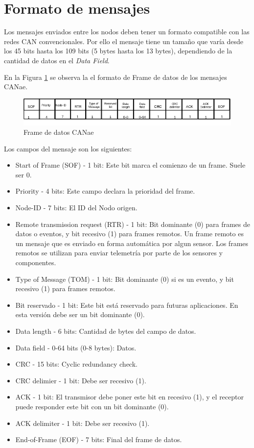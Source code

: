 \section{Formato de mensajes}
Los mensajes enviados entre los nodos deben tener un formato compatible con las
redes CAN convencionales. Por ello el mensaje tiene un tamaño que varía desde
los 45 bits hasta los 109 bits (5 bytes hasta los 13 bytes), dependiendo de la cantidad de datos en el
\textit{Data Field}.

En la Figura \ref{fig:Data_Frame} se observa la el formato de Frame de datos de
los mensajes CANae.

\begin{figure}[h!]
 \centering
 \includegraphics[scale=0.6]{images/Secciones/AppendixA/Data_Frame.jpg}
  \caption{Frame de datos CANae}
\label{fig:Data_Frame}
\end{figure}

Los campos del mensaje son los siguientes:

\begin{itemize}
\item Start of Frame (SOF) - 1 bit: Este bit marca el comienzo de un frame.
  Suele ser 0.
\item Priority - 4 bits: Este campo declara la prioridad del frame. 
\item Node-ID - 7 bits: El ID del Nodo origen.
\item Remote transmission request (RTR) - 1 bit: Bit dominante (0) para frames
  de datos o eventos, y bit recesivo (1) para frames remotos. Un frame remoto
  es un mensaje que es enviado en forma automática por algun sensor. Los frames
  remotos se utilizan para enviar telemetría por parte de los sensores y
  componentes.
\item Type of Message (TOM) - 1 bit: Bit dominante (0) si es un evento, y bit
  recesivo (1) para frames remotos.
\item Bit reservado - 1 bit: Este bit está reservado para futuras aplicaciones.
  En esta versión debe ser un bit dominante (0).
\item Data length - 6 bits: Cantidad de bytes del campo de datos.
\item Data field - 0-64 bits (0-8 bytes): Datos.
\item CRC - 15 bits: Cyclic redundancy check.
\item CRC delimier - 1 bit: Debe ser recesivo (1).
\item ACK - 1 bit: El transmisor debe poner este bit en recesivo (1), y el
  receptor puede responder este bit con un bit dominante (0).
\item ACK delimiter - 1 bit: Debe ser recesivo (1).
\item End-of-Frame (EOF) - 7 bits: Final del frame de datos.
\end{itemize}

